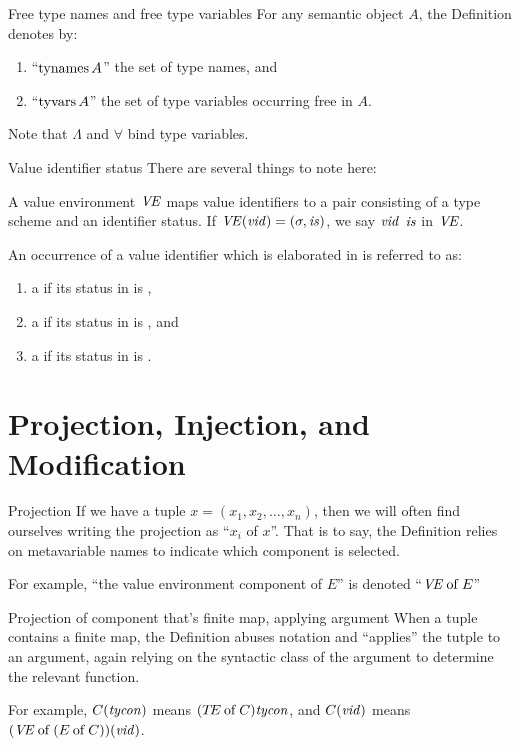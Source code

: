 \begin{definition}{Free type names and free type variables}
For any semantic object $A$, the Definition denotes by:
\begin{enumerate}
\item ``$\mathop{\rm tynames}\nolimits A$'' the set of type names, and
\item ``$\mathop{\rm tyvars}\nolimits A$'' the set of type variables occurring free in $A$.
\end{enumerate}
Note that $\Lambda$ and $\forall$ bind type variables.
\end{definition}

\begin{definition}{Value identifier status}
There are several things to note here:

A value environment $\textit{V\kern-.05emE\/}$ maps value identifiers to a pair
consisting of a type scheme and an identifier status.
If $\textit{V\kern-.05emE\/}(\textit{vid\/})=(\sigma,\textit{is\/})$, we say $\textit{vid\/}$ 
$\textit{is\/}$ in $\textit{V\kern-.05emE\/}$.

An occurrence of a value identifier which is elaborated in \VE{} is
referred to as:
\begin{enumerate}
\item a  if its status in \VE{} is \isv,
\item a  if its status in \VE{} is \isc, and
\item a  if its status in \VE{} is \ise.
\end{enumerate}
\end{definition}

\section{Projection, Injection, and Modification}

\begin{definition}{Projection}
If we have a tuple $x=(x_{1},x_{2},\dots,x_{n})$, then we will often
find ourselves writing the projection as ``$x_{i}$ of $x$''. That is to
say, the Definition relies on metavariable names to indicate which
component is selected.

For example, ``the value environment component of $E$'' is denoted
``$\textit{V\kern-.05emE\/} \mathbin{\rm of} E$''
\end{definition}

\begin{convention}{Projection of component that's finite map, applying argument}
When a tuple contains a finite map, the Definition abuses notation and
``applies'' the tutple to an argument, again relying on the syntactic
class of the argument to determine the relevant function.

For example, $C(\textit{tycon\/})$ means $(\mbox{$T\!E$} \mathbin{\rm of} C)\textit{tycon\/}$,
and $C(\textit{vid\/})$ means $(\textit{V\kern-.05emE\/} \mathbin{\rm of} (E \mathbin{\rm of} C))(\textit{vid\/})$.
\end{convention}

